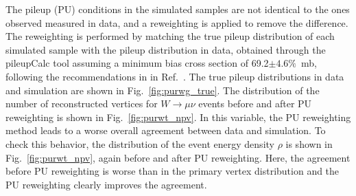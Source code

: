 The pileup (PU) conditions in the simulated samples are not identical to the ones observed measured in data, and a reweighting is applied to remove the difference.
The reweighting is performed by matching the true pileup distribution of each simulated sample
with the pileup distribution in data, obtained through the pileupCalc tool
assuming a minimum bias cross section of 69.2$\pm 4.6\%$~mb, following the recommendations in in Ref.~\cite{pileup_twiki}. The true pileup distributions in data and simulation are shown in Fig.~\ref{fig:purwg_true}. The distribution of the number of reconstructed vertices for $W\to \mu\nu$ events before and after PU reweighting is shown in Fig.~\ref{fig:purwt_npv}. In this variable, the PU reweighting method leads to a worse overall agreement between data and simulation. To check this behavior, the distribution of the event energy density $\rho$ is shown in Fig.~\ref{fig:purwt_npv}, again before and after PU reweighting. Here, the agreement before PU reweighting is worse than in the primary vertex distribution and the PU reweighting clearly improves the agreement.

